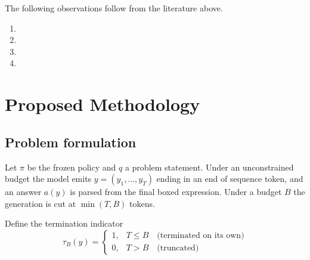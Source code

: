 \documentclass[12pt,a4paper,oneside]{report}
\newif\ifdraft
\newcommand{\writehere}[2]{%
  \ifdraft
    \begin{tcolorbox}[colback=yellow!8,colframe=orange!55,
                      boxrule=0.6pt,left=6pt,right=6pt,top=4pt,bottom=4pt]
    {\small\textbf{WRITE: #1}\\[2pt]#2}
    \end{tcolorbox}
  \fi}
\begin{document}
The following observations follow from the literature above.

\begin{enumerate}[label=(\roman*)]
\item \writehere{Gap 1}{Published accuracies come from uncapped runs and the
degradation curve under realistic budgets is not characterised, even though
deployment cost is the main argument for compact models.}
\item \writehere{Gap 2}{Failure analyses report aggregate accuracy without
separating a wrong answer from an absent one, so two failure modes with different
remedies are scored identically at zero.}
\item \writehere{Gap 3}{Test time scaling methods are evaluated where samples
disagree, so their behaviour where samples agree or produce nothing is untested.}
\item \writehere{Gap 4}{Budget forcing has been evaluated as an extension
mechanism alongside fine tuning, not as a standalone recovery mechanism on a
frozen model, and no measurement exists of whether it can destroy a correct
output.}
\end{enumerate}

\writehere{Closing, 2 to 3 sentences}{
What those four gaps motivated: characterise the curve, decompose the failures,
evaluate forcing with an explicit test for harm, and bound the recovery against
both the selection ceiling and the extraction ceiling.}

\chapter{Proposed Methodology}

\section{Problem formulation}

Let $\pi$ be the frozen policy and $q$ a problem statement. Under an unconstrained
budget the model emits $y = (y_1,\dots,y_T)$ ending in an end of sequence token,
and an answer $a(y)$ is parsed from the final boxed expression. Under a budget $B$
the generation is cut at $\min(T,B)$ tokens.

Define the termination indicator
\begin{equation}
\tau_B(y) =
\begin{cases}
1, & T \le B \quad \text{(terminated on its own)}\\[2pt]
0, & T > B \quad \text{(truncated)}
\end{cases}
\label{eq:tau}
\end{equation}
\end{document}
